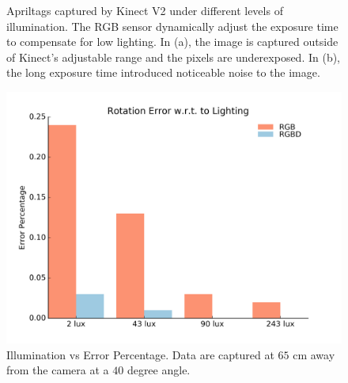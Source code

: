 \begin{figure}
\centering
{}
\caption{Apriltags captured by Kinect V2 under different levels of illumination. The RGB sensor dynamically adjust the exposure time to compensate for low lighting. In (a), the image is captured outside of Kinect's adjustable range and the pixels are underexposed. In (b), the long exposure time introduced noticeable noise to the image. }
\label{fig:illumination_tag}
\end{figure}

\begin{figure}[h]
\centering
\includegraphics[width=\columnwidth]{figs/lighting_fig1}
\caption{Illumination vs Error Percentage. Data are captured at $65$ cm away from the camera at a $40$ degree angle.}
\label{fig:lighting_result}
\end{figure}

